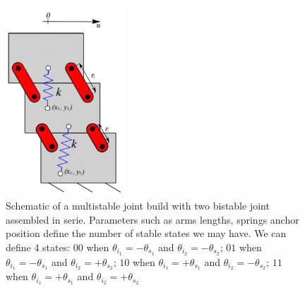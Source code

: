         \begin{figure}
        \centering
        \includegraphics[width=0.40\textwidth]{images/multistable.png}
        \caption{Schematic of a multistable joint build with two bistable joint assembled in serie. Parameters such as arms lengths, springs anchor position define the number of stable states we may have. We can define 4 states: $00$ when $\theta_{i_1} = -\theta_{s_1}$ and $\theta_{i_2} = -\theta_{s_2}$; $01$ when $\theta_{i_1} = -\theta_{s_1}$ and $\theta_{i_2} = +\theta_{s_2}$; $10$ when $\theta_{i_1} = +\theta_{s_1}$ and $\theta_{i_2} = -\theta_{s_2}$; $11$ when $\theta_{i_1} = +\theta_{s_1}$ and $\theta_{i_2} = +\theta_{s_2}$}
        \label{fig:joint_multistable}
        \end{figure}
        
